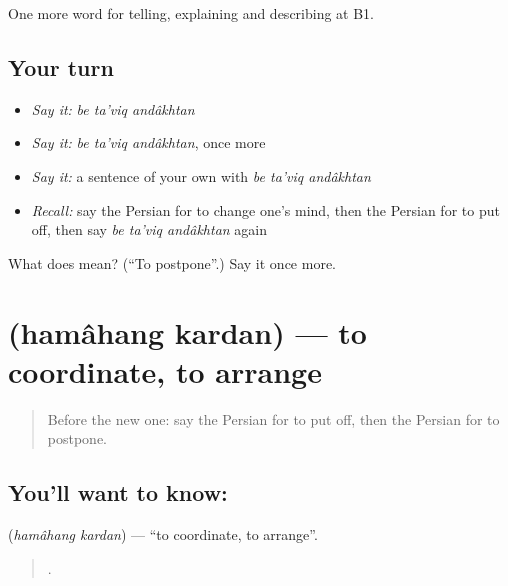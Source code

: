 \begin{grammarlens}[title={What you've built}]
One more word for telling, explaining and describing at B1.
\end{grammarlens}

\subsection*{Your turn}
\begin{itemize}
\raggedright
  \item \emph{Say it:} \emph{be ta'viq andâkhtan}
  \item \emph{Say it:} \emph{be ta'viq andâkhtan}, once more
  \item \emph{Say it:} a sentence of your own with \emph{be ta'viq andâkhtan}
  \item \emph{Recall:} say the Persian for to change one's mind, then the Persian for to put off, then say \emph{be ta'viq andâkhtan} again
\end{itemize}

\begin{tcolorbox}[breakable,colback=teal!4,colframe=teal!35!black,title={Before you move on}]
What does    mean? (\textquotedblleft{}To postpone\textquotedblright{}.) Say it once more.
\end{tcolorbox}
\section[\texorpdfstring{\fa{هماهنگ} \fa{کردن} (hamâhang kardan)}{هماهنگ کردن (hamâhang kardan)}]{  (hamâhang kardan) — to coordinate, to arrange}

\label{lesson:FA-C396-hamahang-kardan}



\begin{quote}
Before the new one: say the Persian for to put off, then the Persian for to postpone.
\end{quote}

\subsection*{You'll want to know:  }
\textbf{ } (\emph{hamâhang kardan}) — \textquotedblleft{}to coordinate, to arrange\textquotedblright{}.

\begin{quote}
       .
\end{quote}

